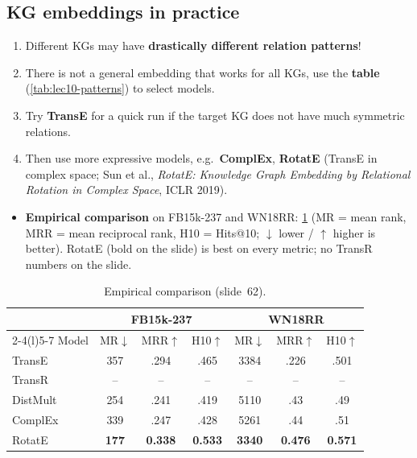 \subsection{KG embeddings in practice}\label{sec:lec10-practice}

\begin{enumerate}
  \item Different KGs may have \textbf{drastically different relation
    patterns}!
  \item There is not a general embedding that works for all KGs, use the
    \textbf{table} (\cref{tab:lec10-patterns}) to select models.
  \item Try \textbf{TransE} for a quick run if the target KG does not have much
    symmetric relations.
  \item Then use more expressive models, e.g.\ \textbf{ComplEx}, \textbf{RotatE}
    (TransE in complex space; Sun et al., \emph{RotatE: Knowledge Graph Embedding
    by Relational Rotation in Complex Space}, ICLR 2019).
\end{enumerate}
\begin{itemize}
  \item \textbf{Empirical comparison} on FB15k-237 and WN18RR:
    \cref{tab:lec10-results} (MR = mean rank, MRR = mean reciprocal rank, H10 =
    Hits@10; $\downarrow$ lower / $\uparrow$ higher is better). RotatE (bold on
    the slide) is best on every metric; no TransR numbers on the slide.
\end{itemize}

\begin{table}[htbp]
  \centering\small
  \caption{Empirical comparison (slide~62).}\label{tab:lec10-results}
  \begin{tabular}{@{}lcccccc@{}}
    \toprule
    & \multicolumn{3}{c}{FB15k-237} & \multicolumn{3}{c}{WN18RR}\\
    \cmidrule(lr){2-4}\cmidrule(l){5-7}
    Model & MR$\downarrow$ & MRR$\uparrow$ & H10$\uparrow$
          & MR$\downarrow$ & MRR$\uparrow$ & H10$\uparrow$\\
    \midrule
    TransE   & 357 & .294 & .465 & 3384 & .226 & .501\\
    TransR   & --  & --   & --   & --   & --   & --\\
    DistMult & 254 & .241 & .419 & 5110 & .43  & .49\\
    ComplEx  & 339 & .247 & .428 & 5261 & .44  & .51\\
    RotatE   & \textbf{177} & \textbf{0.338} & \textbf{0.533}
             & \textbf{3340} & \textbf{0.476} & \textbf{0.571}\\
    \bottomrule
  \end{tabular}
\end{table}

